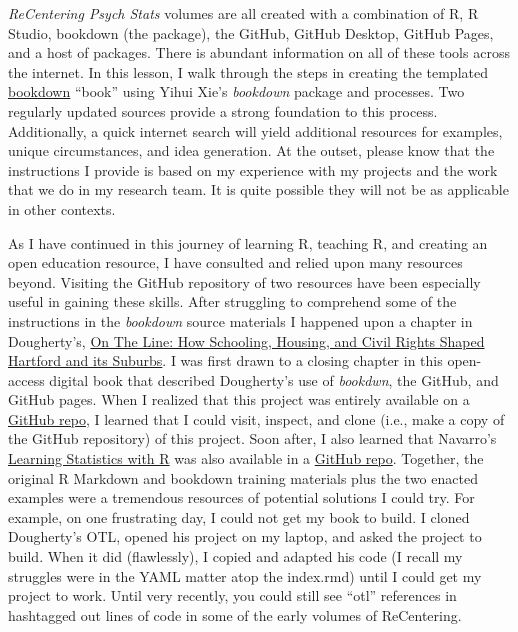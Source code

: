 \documentclass[
]{book}
\begin{document}
\emph{ReCentering Psych Stats} volumes are all created with a combination of R, R Studio, bookdown (the package), the GitHub, GitHub Desktop, GitHub Pages, and a host of packages. There is abundant information on all of these tools across the internet. In this lesson, I walk through the steps in creating the templated \href{https://bookdown.org/}{bookdown} ``book'' using Yihui Xie's \emph{bookdown} package and processes. Two regularly updated sources \citep{xie_authoring_2021, xie_r_2021} provide a strong foundation to this process. Additionally, a quick internet search will yield additional resources for examples, unique circumstances, and idea generation. At the outset, please know that the instructions I provide is based on my experience with my projects and the work that we do in my research team. It is quite possible they will not be as applicable in other contexts.

As I have continued in this journey of learning R, teaching R, and creating an open education resource, I have consulted and relied upon many resources beyond. Visiting the GitHub repository of two resources have been especially useful in gaining these skills. After struggling to comprehend some of the instructions in the \emph{bookdown} source materials I happened upon a chapter in Dougherty's, \href{https://ontheline.trincoll.edu/}{On The Line: How Schooling, Housing, and Civil Rights Shaped Hartford and its Suburbs}. I was first drawn to a closing chapter in this open-access digital book that described Dougherty's \citeyearpar{dougherty_chapter_2021} use of \emph{bookdwn}, the GitHub, and GitHub pages. When I realized that this project was entirely available on a \href{https://github.com/OnTheLine/otl-bookdown}{GitHub repo}, I learned that I could visit, inspect, and clone (i.e., make a copy of the GitHub repository) of this project. Soon after, I also learned that Navarro's \citep{navarro_book_2020} \href{https://learningstatisticswithr.com/}{Learning Statistics with R} was also available in a \href{https://github.com/djnavarro/rbook}{GitHub repo}. Together, the original R Markdown and bookdown training materials plus the two enacted examples were a tremendous resources of potential solutions I could try. For example, on one frustrating day, I could not get my book to build. I cloned Dougherty's OTL, opened his project on my laptop, and asked the project to build. When it did (flawlessly), I copied and adapted his code (I recall my struggles were in the YAML matter atop the index.rmd) until I could get my project to work. Until very recently, you could still see ``otl'' references in hashtagged out lines of code in some of the early volumes of ReCentering.
\end{document}
